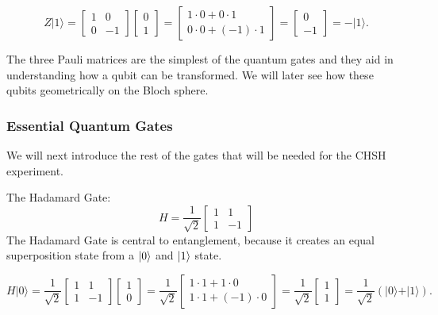 \documentclass[12pt]{article}
\begin{document}
$$
Z \vert 1 \rangle = 
\begin{bmatrix} 1 & 0 \\ 0 & -1 \end{bmatrix}
\begin{bmatrix} 0 \\ 1 \end{bmatrix}
=
\begin{bmatrix} 1\cdot 0 + 0\cdot 1 \\ 0\cdot 0 + (-1)\cdot 1 \end{bmatrix}
=
\begin{bmatrix} 0 \\ -1 \end{bmatrix}
= -\vert 1 \rangle.
$$

The three Pauli matrices are the simplest of the quantum gates and they aid in understanding how a qubit can be transformed. We will later see how these qubits geometrically on the Bloch sphere.

\subsubsection{Essential Quantum Gates}
We will next introduce the rest of the gates that will be needed for the CHSH experiment. 

\vspace{1cm}

The Hadamard Gate:
$$
H = \frac{1}{\sqrt{2}}
\begin{bmatrix}
1 &  1 \\
1 & -1 
\end{bmatrix}
$$
The Hadamard Gate is central to entanglement, because it creates an equal superposition state from a $\ket{0}$ and $\ket{1}$ state.

$$
H \vert 0 \rangle = 
\frac{1}{\sqrt{2}} \begin{bmatrix} 1 & 1 \\ 1 & -1 \end{bmatrix}
\begin{bmatrix} 1 \\ 0 \end{bmatrix}
=
\frac{1}{\sqrt{2}} \begin{bmatrix} 1\cdot1 + 1\cdot0 \\ 1\cdot1 + (-1)\cdot0 \end{bmatrix}
=
\frac{1}{\sqrt{2}} \begin{bmatrix} 1 \\ 1 \end{bmatrix}
=
\frac{1}{\sqrt{2}} \left( \vert 0 \rangle + \vert 1 \rangle \right).
$$
\end{document}
